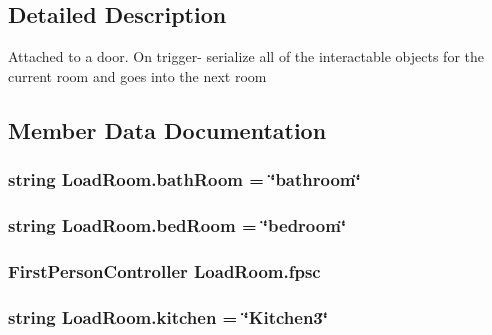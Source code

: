 \subsection{Detailed Description}
Attached to a door. On trigger-\/ serialize all of the interactable objects for the current room and goes into the next room 



\subsection{Member Data Documentation}
\subsubsection[{\texorpdfstring{bath\+Room}{bathRoom}}]{\setlength{\rightskip}{0pt plus 5cm}string Load\+Room.\+bath\+Room = \char`\"{}bathroom\char`\"{}}\hypertarget{class_load_room_a2820dabeeeba9788dcb461d5b6902ab7}{}\label{class_load_room_a2820dabeeeba9788dcb461d5b6902ab7}
\subsubsection[{\texorpdfstring{bed\+Room}{bedRoom}}]{\setlength{\rightskip}{0pt plus 5cm}string Load\+Room.\+bed\+Room = \char`\"{}bedroom\char`\"{}}\hypertarget{class_load_room_a2d61561e98889da07886912d2b877f25}{}\label{class_load_room_a2d61561e98889da07886912d2b877f25}
\subsubsection[{\texorpdfstring{fpsc}{fpsc}}]{\setlength{\rightskip}{0pt plus 5cm}First\+Person\+Controller Load\+Room.\+fpsc}\hypertarget{class_load_room_a6e6cf65efb65b521d908235a47173842}{}\label{class_load_room_a6e6cf65efb65b521d908235a47173842}
\subsubsection[{\texorpdfstring{kitchen}{kitchen}}]{\setlength{\rightskip}{0pt plus 5cm}string Load\+Room.\+kitchen = \char`\"{}Kitchen3\char`\"{}}\hypertarget{class_load_room_ae648aada37ee6e440b80db86f402e99d}{}\label{class_load_room_ae648aada37ee6e440b80db86f402e99d}

